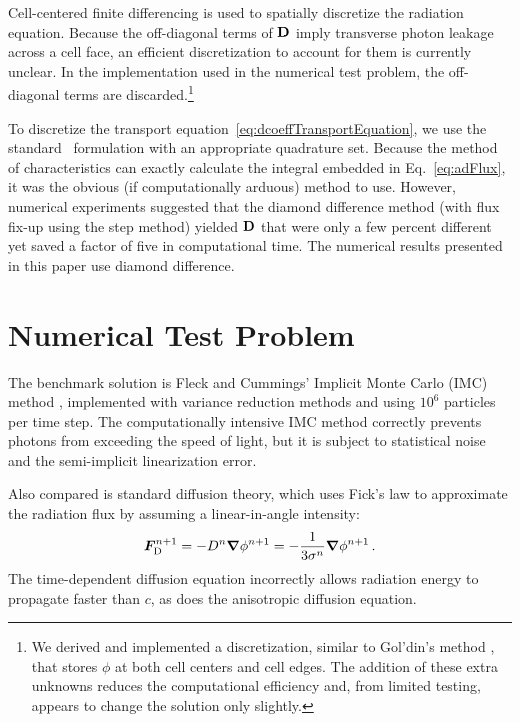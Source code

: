 \documentclass[11pt,letter,twoside]{mc2011}
\newcommand{\Dtens}{\mat{D}}
\begin{document}
Cell-centered finite differencing is used to spatially discretize the radiation
equation. Because the off-diagonal terms of $\Dtens$ imply transverse photon
leakage across a cell face, an efficient discretization to account for them is
currently unclear. In the implementation used in the numerical test problem,
the off-diagonal terms are discarded.\footnote{We derived and implemented a
discretization, similar to Gol'din's method \cite{Wie2009}, that stores $\phi$ at both cell centers and
cell edges. The addition of these extra unknowns reduces the computational
efficiency and, from limited testing, appears to change the solution only
slightly.}

To discretize the transport equation~\eqref{eq:dcoeffTransportEquation}, we use
the standard \SN\ formulation with an appropriate quadrature set. Because the
method of characteristics \cite{Ask1982} can exactly calculate the
integral embedded in Eq.~\eqref{eq:adFlux}, it was the obvious (if
computationally arduous) method to use. However, numerical experiments
suggested that the diamond difference method (with flux fix-up using the step
method) yielded $\Dtens$ that were only a few percent different yet saved a
factor of five in computational time. The numerical results presented in this
paper use diamond difference.

\section{Numerical Test Problem}

The benchmark solution is Fleck and Cummings' Implicit Monte Carlo
(IMC) method \cite{Fle1971}, implemented
with variance reduction methods and using $10^6$ particles per time step. The
computationally intensive IMC method
correctly prevents photons from exceeding the speed of light, but it is subject
to statistical noise and the semi-implicit linearization error.

Also compared is standard diffusion theory, which uses Fick's law to
approximate the radiation flux by assuming a linear-in-angle intensity:
\begin{equation*}
  \bm{F}_\text{D}^{n+1} = - D^{n} \bm{\nabla} \phi^{n+1} 
  = -\frac{1}{3\sigma^{n}} \bm{\nabla} \phi^{n+1}\,.
\end{equation*}
The time-dependent diffusion equation incorrectly allows radiation energy to
propagate faster than $c$, as does the anisotropic diffusion equation.
\end{document}
